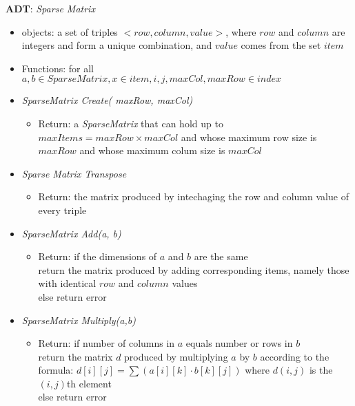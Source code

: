 \documentclass[newPxFont,sthlmFooter,nooffset]{beamer}
\begin{document}
\begin{frame}
\framebreak
\textbf{ADT}: \textit{Sparse Matrix}
\begin{itemize}
  \item objects: a set of triples $<row, column, value>$, where $row$ and $column$ are integers and form a unique combination, and $value$ comes from the set $item$
  \item Functions: for all $a, b \in SparseMatrix, x \in item, i, j, maxCol, maxRow \in index$
\end{itemize}
\framebreak
\begin{itemize}
  \item \textit{SparseMatrix Create( maxRow, maxCol)}
  \begin{itemize}
    \item Return: a \textit{SparseMatrix} that can hold up to $maxItems = maxRow \times maxCol$ and whose maximum row size is $maxRow$ and whose maximum colum size is $maxCol$
  \end{itemize}
  \item \textit{Sparse Matrix Transpose}
  \begin{itemize}
    \item Return: the matrix produced by intechaging the row and column value of every triple
  \end{itemize}
  \item \textit{SparseMatrix Add(a, b)}
  \begin{itemize}
    \item Return: if the dimensions of $a$ and $b$ are the same \\
    return the matrix produced by adding corresponding items, namely those with identical $row$ and $column$ values \\
    else return error
  \end{itemize}
  \item \textit{SparseMatrix Multiply(a,b)}
  \begin{itemize}
    \item Return: if number of columns in $a$ equals number or rows in $b$ \\
    return the matrix $d$ produced by multiplying $a$ by $b$ according to the formula: $d[i][j] = \sum (a[i][k]\cdot b[k][j])$ where $d(i,j)$ is the $(i,j)$th element \\ 
    else return error 
  \end{itemize}
\end{itemize}




\end{frame}
\end{document}

